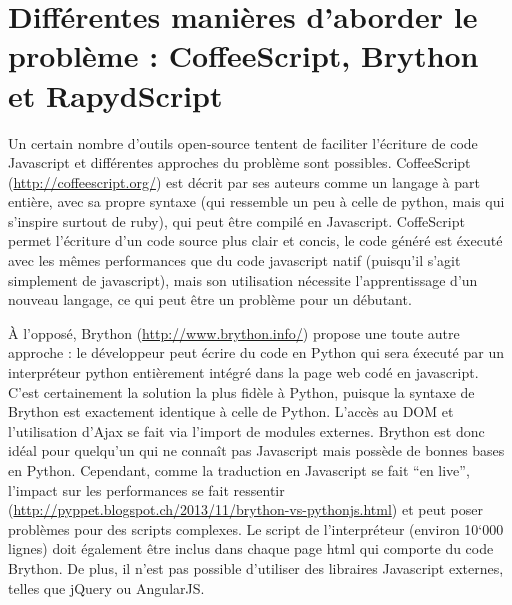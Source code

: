 \documentclass[letterpaper,10pt,french]{sphinxmanual}
\begin{document}
\section{Différentes manières d'aborder le problème : CoffeeScript, Brython et RapydScript}
\label{rapydscript:differentes-manieres-d-aborder-le-probleme-coffeescript-brython-et-rapydscript}
Un certain nombre d'outils open-source tentent de faciliter l'écriture de code Javascript et différentes approches du problème sont possibles. CoffeeScript (\href{http://coffeescript.org/}{http://coffeescript.org/}) est décrit par ses auteurs comme un langage à part entière, avec sa propre syntaxe (qui ressemble un peu à celle de python, mais qui s'inspire surtout de ruby), qui peut être compilé en Javascript. CoffeScript permet l'écriture d'un code source plus clair et concis, le code généré est éxecuté avec les mêmes performances que du code javascript natif (puisqu'il s'agit simplement de javascript), mais son utilisation nécessite l'apprentissage d'un nouveau langage, ce qui peut être un problème pour un débutant.

À l'opposé, Brython (\href{http://www.brython.info/}{http://www.brython.info/}) propose une toute autre approche : le développeur peut écrire du code en Python qui sera éxecuté par un interpréteur python entièrement intégré dans la page web codé en javascript. C'est certainement la solution la plus fidèle à Python, puisque la syntaxe de Brython est exactement identique à celle de Python. L'accès au DOM et l'utilisation d'Ajax se fait via l'import de modules externes. Brython est donc idéal pour quelqu'un qui ne connaît pas Javascript mais possède de bonnes bases en Python. Cependant, comme la traduction en Javascript se fait ``en live'', l'impact sur les performances se fait ressentir (\href{http://pyppet.blogspot.ch/2013/11/brython-vs-pythonjs.html}{http://pyppet.blogspot.ch/2013/11/brython-vs-pythonjs.html}) et peut poser problèmes pour des scripts complexes. Le script de l'interpréteur (environ 10`000 lignes) doit également être inclus dans chaque page html qui comporte du code Brython. De plus, il n'est pas possible d'utiliser des libraires Javascript externes, telles que jQuery ou AngularJS.
\end{document}
